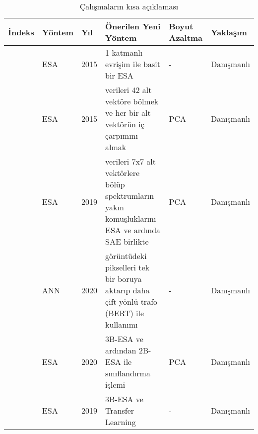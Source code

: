 \begin{table}[ht]
\centering
\begin{adjustbox}{width=1\textwidth}
\begin{threeparttable} %
\caption{Çalışmaların kısa açıklaması}
\begin{tabular}{|l|l|l|L{5cm}|l|l|}
\hline
\textbf{İndeks}        & \textbf{Yöntem} & \textbf{Yıl} & \textbf{Önerilen Yeni Yöntem}                                                                     & \textbf{Boyut Azaltma} & \textbf{Yaklaşım} \\ \hline
\citep{hu2015deep}             & ESA             & 2015         & 1 katmanlı evrişim ile basit bir ESA                                                              & -                      & Danışmanlı        \\ \hline
\citep{yue2015spectral}        & ESA             & 2015         & verileri 42 alt vektöre bölmek ve her bir alt vektörün iç çarpımını almak                         & PCA                    & Danışmanlı        \\ \hline
\citep{li2019adaptive}         & ESA             & 2019         & verileri 7x7 alt vektörlere bölüp spektrumların yakın  komuşluklarını ESA ve ardında SAE birlikte & PCA                    & Danışmanlı        \\ \hline
\citep{he2019hsi}              & ANN             & 2020         & görüntüdeki pikselleri tek bir boruya aktarıp daha çift yönlü trafo (BERT) ile kullanımı          & -                      & Danışmanlı        \\ \hline
\citep{roy2019hybridsn}        & ESA             & 2020         & 3B-ESA ve ardından 2B-ESA ile sınıflandırma işlemi                                                & PCA                    & Danışmanlı        \\ \hline
\citep{jiang2019hyperspectral} & ESA             & 2019         & 3B-ESA ve Transfer Learning                                                                       & -                      & Danışmanlı        \\ \hline
\end{tabular}
\end{threeparttable}
\end{adjustbox}
\end{table}


